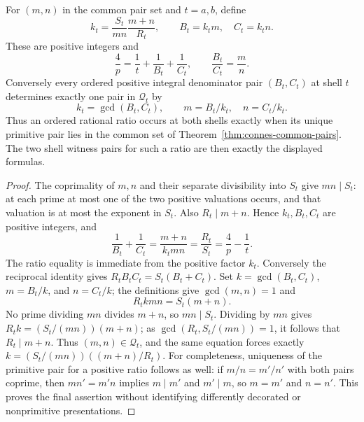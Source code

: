 \begin{proposition}
\label{prop:connes-pair-witness}
For $(m,n)$ in the common pair set and $t=a,b$, define
\[
 k_t=\frac{S_t}{mn}\frac{m+n}{R_t},\qquad
 B_t=k_tm,\quad C_t=k_tn.
\]
These are positive integers and
\[
 \frac4p=\frac1t+\frac1{B_t}+\frac1{C_t},\qquad
 \frac{B_t}{C_t}=\frac mn.
\]
Conversely every ordered positive integral denominator pair $(B_t,C_t)$
at shell $t$ determines exactly one pair in $\mathcal Q_t$ by
\[
 k_t=\gcd(B_t,C_t),\qquad m=B_t/k_t,\quad n=C_t/k_t.
\]
Thus an ordered rational ratio occurs at both shells exactly when its
unique primitive pair lies in the common set of
Theorem~\ref{thm:connes-common-pairs}.  The two shell witness pairs for
such a ratio are then exactly the displayed formulas.
\end{proposition}
\begin{proof}
The coprimality of $m,n$ and their separate divisibility into $S_t$ give
$mn\mid S_t$: at each prime at most one of the two positive valuations
occurs, and that valuation is at most the exponent in $S_t$.
Also $R_t\mid m+n$.  Hence $k_t,B_t,C_t$ are positive integers, and
\[
 \frac1{B_t}+\frac1{C_t}
 =\frac{m+n}{k_tmn}=\frac{R_t}{S_t}=\frac4p-\frac1t.
\]
The ratio equality is immediate from the positive factor $k_t$.
Conversely the reciprocal identity gives
$R_t B_t C_t=S_t(B_t+C_t)$.  Set $k=\gcd(B_t,C_t)$,
$m=B_t/k$, and $n=C_t/k$; the definitions give $\gcd(m,n)=1$ and
\[
 R_t k mn=S_t(m+n).
\]
No prime dividing $mn$ divides $m+n$, so $mn\mid S_t$.  Dividing by
$mn$ gives $R_tk=(S_t/(mn))(m+n)$; as
$\gcd(R_t,S_t/(mn))=1$, it follows that $R_t\mid m+n$.
Thus $(m,n)\in\mathcal Q_t$, and the same equation forces exactly
$k=(S_t/(mn))((m+n)/R_t)$.
For completeness, uniqueness of the primitive pair for a positive ratio
follows as well: if $m/n=m'/n'$ with both pairs coprime, then
$mn'=m'n$ implies $m\mid m'$ and $m'\mid m$, so $m=m'$ and $n=n'$.
This proves the final assertion without identifying differently decorated
or nonprimitive presentations.
\end{proof}

